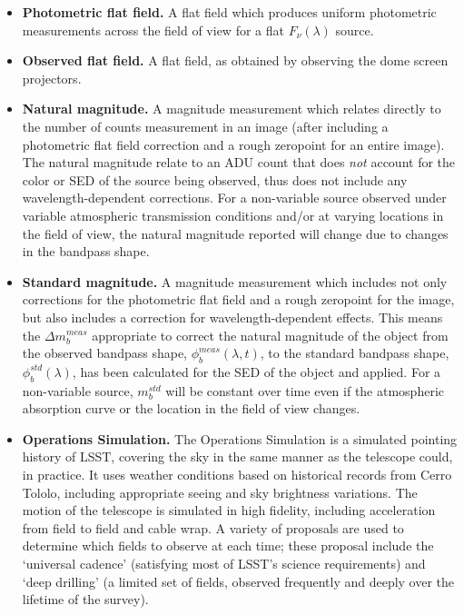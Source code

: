 \documentclass[12pt,preprint]{aastex}
\begin{document}
\begin{itemize}
\item{{\bf Photometric flat field.} A flat field which produces
    uniform photometric measurements across the field of view for a
    flat $F_\nu(\lambda)$ source.}

\item{{\bf Observed flat field.} A flat field, as obtained by
    observing the dome screen projectors.}

\item{{\bf Natural magnitude.} A magnitude measurement which relates
    directly to the number of counts measurement in an image (after
    including a photometric flat field correction and a rough
    zeropoint for an entire image). The natural magnitude relate to
    an ADU count that does {\it not} account for the color or SED of
    the source being observed, thus does not include any
    wavelength-dependent corrections. For a non-variable source
    observed under variable atmospheric transmission conditions and/or at
    varying locations in the field of view, the natural magnitude
    reported will change due to changes in the bandpass shape.} 

\item{{\bf Standard magnitude.} A magnitude measurement which includes
  not only corrections for the photometric flat field and a rough
  zeropoint for the image, but also includes a correction for
  wavelength-dependent effects. This means the $\Delta m_b^{meas}$
  appropriate to correct the natural magnitude of the object from the
  observed bandpass shape,  $\phi_b^{meas}(\lambda,t)$, to the
  standard bandpass shape, $\phi_b^{std}(\lambda)$, has been
  calculated for the SED of the object and applied.  For a
  non-variable source, $m_b^{std}$ will be constant over time even if
  the atmospheric absorption curve or the location in the field of
  view changes.}

\item{{\bf Operations Simulation.} The Operations Simulation is a
simulated pointing history of LSST, covering the sky in the same
manner as the telescope could, in practice. It uses weather conditions
based on historical records from Cerro Tololo, including appropriate
seeing and sky brightness variations. The motion of the telescope is
simulated in high fidelity, including acceleration from field to field
and cable wrap.  A variety of proposals are used to determine which
fields to observe at each time; these proposal include the `universal
cadence' (satisfying most of LSST's science requirements) and `deep
drilling' (a limited set of fields, observed frequently and deeply
over the lifetime of the survey). }

\end{itemize}
\end{document}
